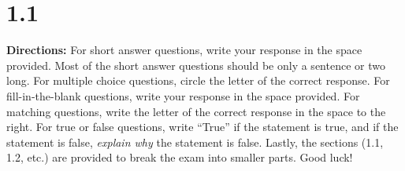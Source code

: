 \section*{1.1 \squigglyline}

\textbf{Directions:} For short answer questions, write your response in the space provided. Most of the short answer questions should be only a sentence or two long. For multiple choice questions, circle the letter of the correct response. For fill-in-the-blank questions, write your response in the space provided. For matching questions, write the letter of the correct response in the space to the right. For true or false questions, write ``True'' if the statement is true, and if the statement is false, \textit{explain why} the statement is false. Lastly, the sections (1.1, 1.2, etc.) are provided to break the exam into smaller parts. Good luck!

